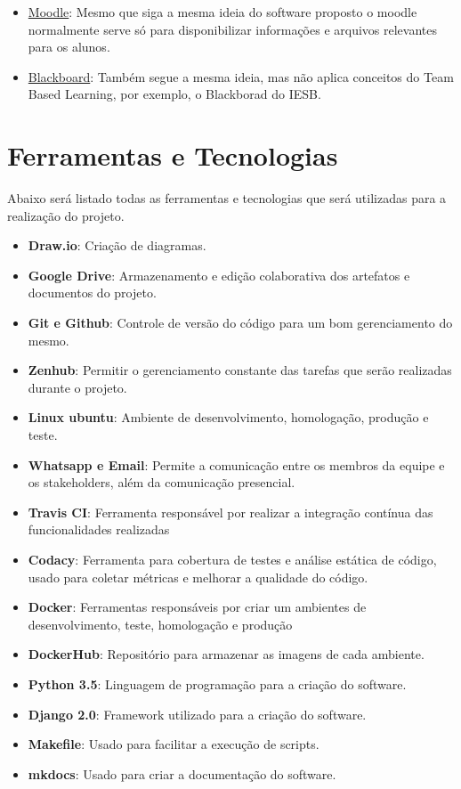 \begin{itemize}
  \item \href{https://aprender.unb.br/}{Moodle}: Mesmo que siga a mesma ideia do software proposto o moodle normalmente serve só para disponibilizar informações e arquivos relevantes para os alunos.
  \item \href{https://iesb.blackboard.com/}{Blackboard}: Também segue a mesma ideia, mas não aplica conceitos do Team Based Learning, por exemplo, o Blackborad do IESB.
\end{itemize}

\section{Ferramentas e Tecnologias}

Abaixo será listado todas as ferramentas e tecnologias que será utilizadas para a realização do projeto.

\begin{itemize}
  \item \textbf{Draw.io}: Criação de diagramas.
  \item \textbf{Google Drive}: Armazenamento e edição colaborativa dos artefatos e documentos do projeto.
  \item \textbf{Git e Github}: Controle de versão do código para um bom gerenciamento do mesmo.
  \item \textbf{Zenhub}: Permitir o gerenciamento constante das tarefas que serão realizadas durante o projeto.
  \item \textbf{Linux ubuntu}: Ambiente de desenvolvimento, homologação, produção e teste.
  \item \textbf{Whatsapp e Email}: Permite a comunicação entre os membros da equipe e os stakeholders, além da
    comunicação presencial.
  \item \textbf{Travis CI}: Ferramenta responsável por realizar a integração contínua das funcionalidades realizadas
  \item \textbf{Codacy}: Ferramenta para cobertura de testes e análise estática de código, usado para coletar métricas e
    melhorar a qualidade do código.
  \item \textbf{Docker}: Ferramentas responsáveis por criar um ambientes de desenvolvimento, teste, homologação e produção
  \item \textbf{DockerHub}: Repositório para armazenar as imagens de cada ambiente.
  \item \textbf{Python 3.5}: Linguagem de programação para a criação do software.
  \item \textbf{Django 2.0}: Framework utilizado para a criação do software.
  \item \textbf{Makefile}: Usado para facilitar a execução de scripts.
  \item \textbf{mkdocs}: Usado para criar a documentação do software.
\end{itemize}

